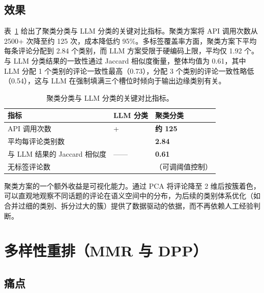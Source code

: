 \documentclass[11pt]{ctexart}
\begin{document}
\subsection{效果}

表~\ref{tab:cluster} 给出了聚类分类与 LLM 分类的关键对比指标。聚类方案将 API 调用次数从 2500+ 次降至约 125 次，成本降低约 95\%。多标签覆盖率方面，聚类方案下平均每条评论分配到 2.84 个类别，而 LLM 方案受限于硬编码上限，平均仅 1.92 个。与 LLM 分类结果的一致性通过 Jaccard 相似度衡量，整体均值为 0.61，其中 LLM 分配 1 个类别的评论一致性最高（0.73），分配 3 个类别的评论一致性略低（0.54），这与 LLM 在强制填满三个槽位时倾向于输出边缘类别有关。

\begin{table}[H]
  \centering
  \small
  \caption{聚类分类与 LLM 分类的关键对比指标。}
  \label{tab:cluster}
  \renewcommand{\arraystretch}{1.2}
  \begin{tabularx}{\textwidth}{>{\raggedright\arraybackslash}p{6.0cm} >{\centering\arraybackslash}X >{\centering\arraybackslash}X}
    \toprule
    \rowcolor{Soft}
    \textbf{指标} & \textbf{LLM 分类} & \textbf{聚类分类} \\
    \midrule
    API 调用次数               & 2500+   & \textbf{约 125} \\
    平均每评论类别数            & 1.92    & \textbf{2.84} \\
    与 LLM 结果的 Jaccard 相似度 & ——     & \textbf{0.61} \\
    无标签评论数                & 0       & 47（可调阈值控制） \\
    \bottomrule
  \end{tabularx}
\end{table}

聚类方案的一个额外收益是可视化能力。通过 PCA 将评论降至 2 维后按簇着色，可以直观地观察不同话题的评论在语义空间中的分布，为后续的类别体系优化（如合并过细的类别、拆分过大的簇）提供了数据驱动的依据，而不再依赖人工经验判断。

\section{多样性重排（MMR 与 DPP）}

\subsection{痛点}
\end{document}
